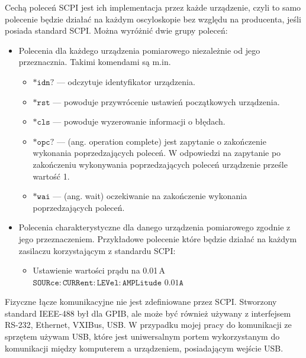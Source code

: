 Cechą poleceń SCPI jest ich implementacja przez każde urządzenie, czyli to samo polecenie będzie działać na każdym oscyloskopie
bez względu na producenta, jeśli posiada standard SCPI. Można wyróżnić dwie grupy poleceń:
\begin{itemize}
\item Polecenia dla każdego urządzenia pomiarowego niezależnie od jego przeznacznia. Takimi komendami są m.in.
\begin{itemize}
\item $\mathtt{*idn?}$ --- odczytuje identyfikator urządzenia.
\item $\mathtt{*rst}$ --- powoduje przywrócenie ustawień początkowych urządzenia.
\item $\mathtt{*cls}$ --- powoduje wyzerowanie informacji o błędach.
\item $\mathtt{*opc?}$ --- (ang. operation complete) jest zapytanie o zakończenie wykonania
poprzedzających poleceń.
W odpowiedzi na zapytanie po zakończeniu wykonywania poprzedzających poleceń urządzenie prześle wartość 1.
\item $\mathtt{*wai}$ --- (ang. wait) oczekiwanie na zakończenie wykonania poprzedzających poleceń.
\end{itemize}

\item Polecenia charakterystyczne dla danego urządzenia pomiarowego zgodnie z jego przeznaczeniem.
Przykładowe polecenie które będzie działać na każdym zasilaczu korzystającym z standardu SCPI:
\begin{itemize}
\item Ustawienie wartości prądu na 0.01\,A \\ $\mathtt{SOURce:CURRent:LEVel:AMPLitude}$ $\mathtt{0.01 A} $
\end{itemize}
\end{itemize}

Fizyczne łącze komunikacyjne nie jest zdefiniowane przez SCPI. Stworzony standard IEEE-488 był dla GPIB,
ale może być również używany z interfejsem RS-232, Ethernet, VXIBus, USB. W przypadku mojej pracy do komunikacji ze sprzętem
używam USB, które jest uniwersalnym portem wykorzystanym do komunikacji między komputerem a urządzeniem, posiadającym wejście USB.
\newpage